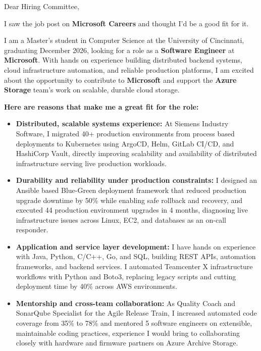 \documentclass[11pt]{letter}
\date{}
\begin{document}
\begin{letter}{}

\opening{Dear Hiring Committee,}

I saw the job post on \textbf{Microsoft Careers} and thought I'd be a good fit for it.

I am a Master's student in Computer Science at the University of Cincinnati, graduating December 2026, looking for a role as a \textbf{Software Engineer} at \textbf{Microsoft}. With hands on experience building distributed backend systems, cloud infrastructure automation, and reliable production platforms, I am excited about the opportunity to contribute to \textbf{Microsoft} and support the \textbf{Azure Storage} team's work on scalable, durable cloud storage.

\textbf{Here are reasons that make me a great fit for the role:}

\begin{itemize}[leftmargin=*, itemsep=0.45em]
    \item \textbf{Distributed, scalable systems experience:} At Siemens Industry Software, I migrated 40+ production environments from process based deployments to Kubernetes using ArgoCD, Helm, GitLab CI/CD, and HashiCorp Vault, directly improving scalability and availability of distributed infrastructure serving live production workloads.

    \item \textbf{Durability and reliability under production constraints:} I designed an Ansible based Blue-Green deployment framework that reduced production upgrade downtime by 50\% while enabling safe rollback and recovery, and executed 44 production environment upgrades in 4 months, diagnosing live infrastructure issues across Linux, EC2, and databases as an on-call responder.

    \item \textbf{Application and service layer development:} I have hands on experience with Java, Python, C/C++, Go, and SQL, building REST APIs, automation frameworks, and backend services. I automated Teamcenter X infrastructure workflows with Python and Boto3, replacing legacy scripts and cutting deployment time by 40\% across AWS environments.

    \item \textbf{Mentorship and cross-team collaboration:} As Quality Coach and SonarQube Specialist for the Agile Release Train, I increased automated code coverage from 35\% to 78\% and mentored 5 software engineers on extensible, maintainable coding practices, experience I would bring to collaborating closely with hardware and firmware partners on Azure Archive Storage.
\end{itemize}


\end{letter}
\end{document}
